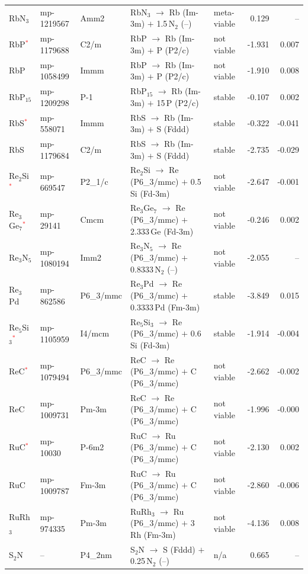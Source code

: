 \begin{longtable}{@{}ll l@{\hspace{4pt}} p{4.6cm} l@{\hspace{4pt}} rr@{}}
RbN$_{3}$ & mp-1219567 & Amm2 & RbN$_{3}$ $\to$ Rb (Im-3m) $+$ 1.5\,N$_{2}$ (--) & meta-viable & 0.129 & -- \\
RbP\textcolor{red}{$^*$} & mp-1179688 & C2/m & RbP $\to$ Rb (Im-3m) $+$ P (P2/c) & not viable & -1.931 & 0.007 \\
RbP & mp-1058499 & Immm & RbP $\to$ Rb (Im-3m) $+$ P (P2/c) & not viable & -1.910 & 0.008 \\
RbP$_{15}$ & mp-1209298 & P-1 & RbP$_{15}$ $\to$ Rb (Im-3m) $+$ 15\,P (P2/c) & stable & -0.107 & 0.002 \\
RbS\textcolor{red}{$^*$} & mp-558071 & Immm & RbS $\to$ Rb (Im-3m) $+$ S (Fddd) & stable & -0.322 & -0.041 \\
RbS & mp-1179684 & C2/m & RbS $\to$ Rb (Im-3m) $+$ S (Fddd) & stable & -2.735 & -0.029 \\
Re$_{2}$Si\textcolor{red}{$^*$} & mp-669547 & P2\_1/c & Re$_{2}$Si $\to$ Re (P6\_3/mmc) $+$ 0.5\,Si (Fd-3m) & not viable & -2.647 & -0.001 \\
Re$_{3}$Ge$_{7}$\textcolor{red}{$^*$} & mp-29141 & Cmcm & Re$_{3}$Ge$_{7}$ $\to$ Re (P6\_3/mmc) $+$ 2.333\,Ge (Fd-3m) & not viable & -0.246 & 0.002 \\
Re$_{3}$N$_{5}$ & mp-1080194 & Imm2 & Re$_{3}$N$_{5}$ $\to$ Re (P6\_3/mmc) $+$ 0.8333\,N$_{2}$ (--) & not viable & -2.055 & -- \\
Re$_{3}$Pd & mp-862586 & P6\_3/mmc & Re$_{3}$Pd $\to$ Re (P6\_3/mmc) $+$ 0.3333\,Pd (Fm-3m) & stable & -3.849 & 0.015 \\
Re$_{5}$Si$_{3}$\textcolor{red}{$^*$} & mp-1105959 & I4/mcm & Re$_{5}$Si$_{3}$ $\to$ Re (P6\_3/mmc) $+$ 0.6\,Si (Fd-3m) & stable & -1.914 & -0.004 \\
ReC\textcolor{red}{$^*$} & mp-1079494 & P6\_3/mmc & ReC $\to$ Re (P6\_3/mmc) $+$ C (P6\_3/mmc) & not viable & -2.662 & -0.002 \\
ReC & mp-1009731 & Pm-3m & ReC $\to$ Re (P6\_3/mmc) $+$ C (P6\_3/mmc) & not viable & -1.996 & -0.000 \\
RuC\textcolor{red}{$^*$} & mp-10030 & P-6m2 & RuC $\to$ Ru (P6\_3/mmc) $+$ C (P6\_3/mmc) & not viable & -2.130 & 0.002 \\
RuC & mp-1009787 & Fm-3m & RuC $\to$ Ru (P6\_3/mmc) $+$ C (P6\_3/mmc) & not viable & -2.860 & -0.006 \\
RuRh$_{3}$ & mp-974335 & Pm-3m & RuRh$_{3}$ $\to$ Ru (P6\_3/mmc) $+$ 3\,Rh (Fm-3m) & not viable & -4.136 & 0.008 \\
S$_{2}$N & -- & P4\_2nm & S$_{2}$N $\to$ S (Fddd) $+$ 0.25\,N$_{2}$ (--) & n/a & 0.665 & -- \\

\end{longtable}
